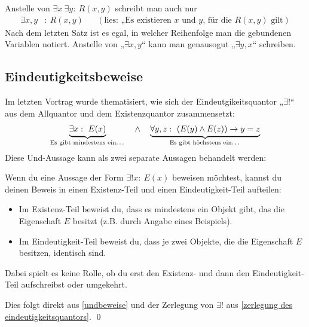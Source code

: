  
 \begin{bem}
  Anstelle von $\exists x\ \exists y:\ R(x,y)$ schreibt man auch nur
  \begin{align*}
    \exists x,y& :\ R(x,y) && (\text{lies: „Es existieren $x$ und $y$, für die $R(x,y)$ gilt})
  \end{align*}
Nach dem letzten Satz ist es egal, in welcher Reihenfolge man die gebundenen Variablen notiert. Anstelle von „$\exists x,y$“ kann man genausogut „$\exists y,x$“ schreiben.
 \end{bem}


 

 
 
 

 
 
\subsection{Eindeutigkeitsbeweise}
Im letzten Vortrag wurde thematisiert, wie sich der Eindeutgikeitsquantor „$\exists !$“ aus dem Allquantor und dem Existenzquantor zusammensetzt:
\[ \underbrace{\exists x:\ E(x)}_{\text{Es gibt mindestens ein\dots}}\quad \land\quad \underbrace{\forall y,z:\ (E(y)\land E(z)) \to y=z}_{\text{Es gibt höchstens ein\dots}}\]
Diese Und-Aussage kann als zwei separate Aussagen behandelt werden:
\begin{sat}
 Wenn du eine Aussage der Form $\exists ! x:\ E(x)$ beweisen möchtest, kannst du deinen Beweis in einen Existenz-Teil und einen Eindeutigkeit-Teil aufteilen:
 \begin{itemize}
  \item Im Existenz-Teil beweist du, dass es mindestens ein Objekt gibt, das die Eigenschaft $E$ besitzt (z.B. durch Angabe eines Beispiels).
  \item Im Eindeutigkeit-Teil beweist du, dass je zwei Objekte, die die Eigenschaft $E$ besitzen, identisch sind.
 \end{itemize}
Dabei spielt es keine Rolle, ob du erst den Existenz- und dann den Eindeutigkeit-Teil aufschreibst oder umgekehrt.
\end{sat}
\begin{bew}
 Dies folgt direkt aus \cref{undbeweise} und der Zerlegung von $\exists !$ aus \cref{zerlegung des eindeutigkeitsquantors}. \qed
\end{bew}




